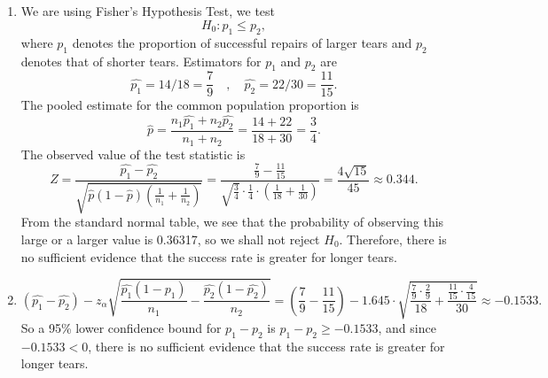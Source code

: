 \documentclass[11pt,a4paper]{article}
\begin{document}
\subsection{}
\begin{enumerate}[label=\roman*)]
\item
We are using Fisher’s Hypothesis Test, we test $$H_0:p_1\leqslant p_2,$$
where $p_1$ denotes the proportion of successful repairs of larger tears and $p_2$ denotes that of shorter tears. Estimators for $p_1$ and $p_2$ are $$\hat{p_1}=14/18=\frac{7}{9}\quad,\quad\hat{p_2}=22/30=\frac{11}{15}.$$
The pooled estimate for the common population proportion is
$$\hat{p}=\frac{n_1\hat{p_1}+n_2\hat{p_2}}{n_1+n_2}=\frac{14+22}{18+30}=\frac{3}{4}.$$
The observed value of the test statistic is
$$Z=\frac{\hat{p_1}-\hat{p_2}}{\sqrt{\hat{p}(1-\hat{p})\left(\frac{1}{n_1}+\frac{1}{n_2}\right)}}=\frac{\frac{7}{9}-\frac{11}{15}}{\sqrt{\frac{3}{4}}\cdot\frac{1}{4}\cdot\left(\frac{1}{18}+\frac{1}{30}\right)}=\frac{4\sqrt{15}}{45}\approx0.344.$$
From the standard normal table, we see that the probability of observing
this large or a larger value is 0.36317, so we shall not reject $H_0$. Therefore, there is no sufficient evidence that the success rate is greater for longer tears.
\item
$$(\hat{p_1}-\hat{p_2})-z_{\alpha}\sqrt{\frac{\hat{p_1}(1-\hat{p_1})}{n_1}-\frac{\hat{p_2}(1-\hat{p_2})}{n_2}}=\left(\frac{7}{9}-\frac{11}{15}\right)-1.645\cdot\sqrt{\frac{\frac{7}{9}\cdot\frac{2}{9}}{18}+\frac{\frac{11}{15}\cdot\frac{4}{15}}{30}}\approx-0.1533.$$
So a 95\% lower confidence bound for $p_1-p_2$ is $p_1-p_2\geqslant -0.1533$, and since $-0.1533<0$, there is no sufficient evidence that the success rate is greater for longer tears.
\end{enumerate}
\end{document}
